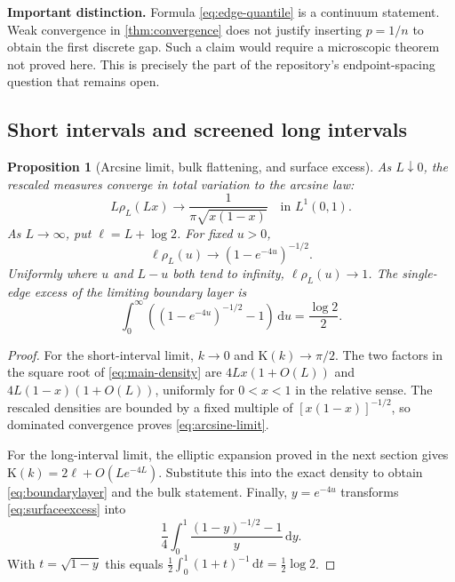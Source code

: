 \documentclass[11pt,a4paper]{article}
\newtheorem{proposition}[theorem]{Proposition}
\theoremstyle{definition}
\theoremstyle{remark}
\newcommand{\dd}{\,\mathrm d}
\newcommand{\K}{\mathrm K}
\begin{document}
\textbf{Important distinction.} Formula \eqref{eq:edge-quantile} is a
continuum statement. Weak convergence in \cref{thm:convergence} does not
justify inserting $p=1/n$ to obtain the first discrete gap. Such a claim
would require a microscopic theorem not proved here. This is precisely the
part of the repository's endpoint-spacing question that remains open.

\subsection{Short intervals and screened long intervals}
\begin{proposition}[Arcsine limit, bulk flattening, and surface excess]
\label{prop:continuumregimes}
As $L\downarrow0$, the rescaled measures converge in total variation to the
arcsine law:
\begin{equation}
 L\rho_L(Lx)\longrightarrow\frac1{\pi\sqrt{x(1-x)}}
 \quad\text{in }L^1(0,1).
 \label{eq:arcsine-limit}
\end{equation}
As $L\to\infty$, put $\ell=L+\log2$. For fixed $u>0$,
\begin{equation}
 \ell\rho_L(u)\longrightarrow(1-e^{-4u})^{-1/2}.
 \label{eq:boundarylayer}
\end{equation}
Uniformly where $u$ and $L-u$ both tend to infinity,
$\ell\rho_L(u)\to1$. The single-edge excess of the limiting boundary layer is
\begin{equation}
 \int_0^\infty\left((1-e^{-4u})^{-1/2}-1\right)\dd u
 =\frac{\log2}{2}.
 \label{eq:surfaceexcess}
\end{equation}
\end{proposition}
\begin{proof}
For the short-interval limit, $k\to0$ and $\K(k)\to\pi/2$.
The two factors in the square root of \eqref{eq:main-density} are
$4Lx(1+O(L))$ and $4L(1-x)(1+O(L))$, uniformly for $0<x<1$ in the relative
sense. The rescaled densities are bounded by a fixed multiple of
$[x(1-x)]^{-1/2}$, so dominated convergence proves \eqref{eq:arcsine-limit}.

For the long-interval limit, the elliptic expansion proved in the next
section gives $\K(k)=2\ell+O(Le^{-4L})$. Substitute this into the exact
density to obtain \eqref{eq:boundarylayer} and the bulk statement.
Finally, $y=e^{-4u}$ transforms \eqref{eq:surfaceexcess} into
\[
 \frac14\int_0^1\frac{(1-y)^{-1/2}-1}{y}\dd y.
\]
With $t=\sqrt{1-y}$ this equals
$\frac12\int_0^1(1+t)^{-1}\dd t=\frac12\log2$.
\end{proof}
\end{document}
